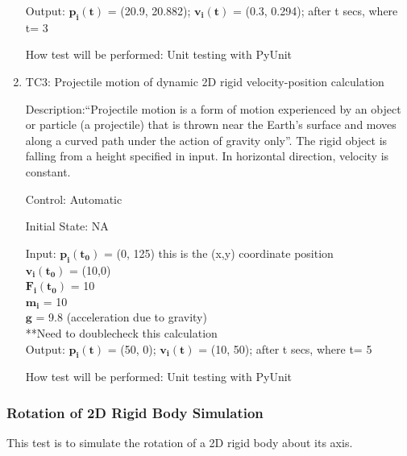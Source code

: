 \documentclass[12pt, titlepage]{article}
\begin{document}
\begin{enumerate}
	  
Output: $\mathbf{p_i}$$\mathbf{(t)}$ = (20.9, 20.882);
		$\mathbf{v_i}$$\mathbf{(t)}$ = (0.3, 0.294); after t secs, where t= 3 
					
How test will be performed: Unit testing with PyUnit

\item{TC3: Projectile motion of dynamic 2D rigid velocity-position calculation\\}

Description:``Projectile motion is a form of motion experienced by an object or particle (a projectile) that is thrown near the Earth's surface and moves along a curved path under the action of gravity only''. The rigid object is falling from a height specified in input. In horizontal direction, velocity is constant.

Control: Automatic

Initial State: NA

Input: $\mathbf{p_i}$$\mathbf{(t_0)}$ = (0, 125) this is the (x,y) coordinate position\\
\hspace*{1.3cm}$\mathbf{v_i}$$\mathbf{(t_0)}$ = (10,0)\\
\hspace*{1.3cm}$\mathbf{F_i}$$\mathbf{(t_0)}$ = 10\\
\hspace*{1.3cm}$\mathbf{m_i}$$ \mathbf{}$ = 10\\
\hspace*{1.3cm}$\mathbf{g}$$\mathbf{}$ = 9.8 (acceleration due to gravity)\\
**Need to doublecheck this calculation\\
Output: $\mathbf{p_i}$$\mathbf{(t)}$ = (50, 0);
$\mathbf{v_i}$$\mathbf{(t)}$ = (10, 50); after t secs, where t= 5 

How test will be performed: Unit testing with PyUnit

\end{enumerate}

\subsubsection{Rotation of 2D Rigid Body Simulation}
This test is to simulate the rotation of a 2D rigid body about its axis.
\end{document}
